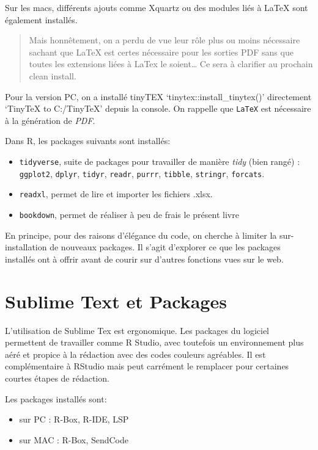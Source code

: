 \documentclass[
  letterpaper,
  DIV=11,
  numbers=noendperiod]{scrreprt}
\providecommand{\tightlist}{%
  \setlength{\itemsep}{0pt}\setlength{\parskip}{0pt}}\usepackage{longtable,booktabs,array}
\begin{document}
Sur les macs, différents ajouts comme Xquartz ou des modules liés à
LaTeX sont également installés.

\begin{quote}
Mais honnêtement, on a perdu de vue leur rôle plus ou moins nécessaire
sachant que LaTeX est certes nécessaire pour les sorties PDF sans que
toutes les extensions liées à LaTex le soient\ldots{} Ce sera à
clarifier au prochain clean install.
\end{quote}

Pour la version PC, on a installé tinyTEX `tinytex::install\_tinytex()'
directement `TinyTeX to C:\Users\nbr\AppData\Roaming/TinyTeX' depuis la
console. On rappelle que \texttt{LaTeX} est nécessaire à la génération
de \emph{PDF}.

Dans R, les packages suivants sont installés:

\begin{itemize}
\tightlist
\item
  \texttt{tidyverse}, suite de packages pour travailler de manière
  \emph{tidy} (bien rangé) : \texttt{ggplot2}, \texttt{dplyr},
  \texttt{tidyr}, \texttt{readr}, \texttt{purrr}, \texttt{tibble},
  \texttt{stringr}, \texttt{forcats}.
\item
  \texttt{readxl}, permet de lire et importer les fichiers .xlsx.
\item
  \texttt{bookdown}, permet de réaliser à peu de frais le présent livre
\end{itemize}

En principe, pour des raisons d'élégance du code, on cherche à limiter
la sur-installation de nouveaux packages. Il s'agit d'explorer ce que
les packages installés ont à offrir avant de courir sur d'autres
fonctions vues sur le web.

\hypertarget{sublime-text-et-packages}{%
\section{Sublime Text et Packages}\label{sublime-text-et-packages}}

L'utilisation de Sublime Tex est ergonomique. Les packages du logiciel
permettent de travailler comme R Studio, avec toutefois un environnement
plus aéré et propice à la rédaction avec des codes couleurs agréables.
Il est complémentaire à RStudio mais peut carrément le remplacer pour
certaines courtes étapes de rédaction.

Les packages installés sont:

\begin{itemize}
\tightlist
\item
  sur PC : R-Box, R-IDE, LSP
\item
  sur MAC : R-Box, SendCode
\end{itemize}
\end{document}
